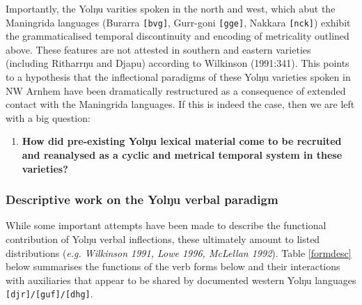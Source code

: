 \documentclass[12pt]{article}
\begin{document}
Importantly, the Yolŋu varities spoken in the north and west, which abut the Maningrida languages (Burarra \texttt{[bvg]}, Gurr-goni \texttt{[gge]}, Nakkara \texttt{[nck]}) exhibit the grammaticalised temporal discontinuity and encoding of metricality outlined above. These features are not attested in southern and eastern varieties (including Ritharrŋu and Djapu) according to Wilkinson (1991:341). This points to a hypothesis that the inflectional paradigms of these Yolŋu varieties spoken in NW Arnhem have been dramatically restructured as a consequence of extended contact with the Maningrida languages. If this is indeed the case, then we are left with a big question: 
\begin{framed}\begin{enumerate}[label=\textbf{(\roman*)}]
		\item \textbf{How did pre-existing Yolŋu lexical material come to be recruited and reanalysed as a cyclic and metrical temporal system in these varieties?}\end{enumerate}\end{framed}

\subsubsection{Descriptive work on the Yolŋu verbal paradigm}
While some important attempts have been made to describe the functional contribution of Yolŋu verbal inflections, these ultimately amount to listed distributions (\textit{e.g. Wilkinson 1991, Lowe 1996, McLellan 1992}). Table \ref{formdesc} below summarises the functions of the verb forms below and their interactions with auxiliaries that appear to be shared by documented western Yolŋu languages \texttt{[djr]/[guf]/[dhg]}.
\end{document}
